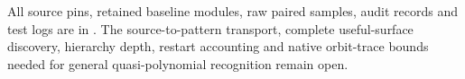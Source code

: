 All source pins, retained baseline modules, raw paired samples, audit
records and test logs are in .
The source-to-pattern transport, complete useful-surface discovery,
hierarchy depth, restart accounting and native orbit-trace bounds needed
for general quasi-polynomial recognition remain open.
